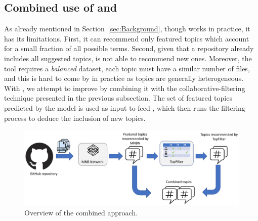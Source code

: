 %
%
%
%



\subsection{Combined use of \TFb and \MNB} \label{sec:combined_approach}


As already mentioned in Section~\ref{sec:Background}, though \MNB works in 
practice, it has its limitations. First, it can recommend only featured topics 
which account for a small fraction of all possible terms. Second, given that a 
repository already includes all suggested topics, \MNB is not able to recommend 
new ones. Moreover, the tool requires a \emph{balanced} dataset, \ie each topic 
must have a similar number of \RM files, and this is hard to come by in 
practice as topics are generally heterogeneous. With \TFb, we attempt to 
improve \MNB by combining it with the collabora\-tive-filtering technique 
presented in the previous subsection. The set of featured topics predicted by 
the \MNB model is used as input to feed \TFa, which then runs the filtering 
process to deduce the inclusion of new topics.

\begin{figure}[h!]
	\centering
	\includegraphics[width=\linewidth]{figs/entangled.pdf}
	\caption{Overview of the combined approach.}
	\label{fig:entangled}
\end{figure}

